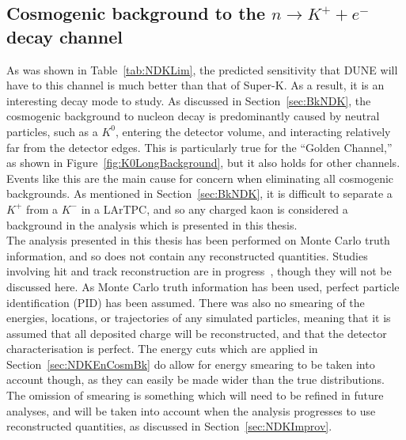 \subsection{Cosmogenic background to the $n \rightarrow K^{+} + e^{-}$ decay channel} \label{sec:NDKCosmBk}
As was shown in Table~\ref{tab:NDKLim}, the predicted sensitivity that DUNE will have to this channel is much better than that of Super-K. As a result, it is an interesting decay mode to study. As discussed in Section~\ref{sec:BkNDK}, the cosmogenic background to nucleon decay is predominantly caused by neutral particles, such as a $K^0$, entering the detector volume, and interacting relatively far from the detector edges. This is particularly true for the ``Golden Channel,'' as shown in Figure~\ref{fig:K0LongBackground}, but it also holds for other channels. Events like this are the main cause for concern when eliminating all cosmogenic backgrounds. As mentioned in Section~\ref{sec:BkNDK}, it is difficult to separate a $K^+$ from a $K^-$ in a LArTPC, and so any charged kaon is considered a background in the analysis which is presented in this thesis. \\

The analysis presented in this thesis has been performed on Monte Carlo truth information, and so does not contain any reconstructed quantities. Studies involving hit and track reconstruction are in progress~\citep{CosmoJanCollabMeeting}, though they will not be discussed here. As Monte Carlo truth information has been used, perfect particle identification (PID) has been assumed. There was also no smearing of the energies, locations, or trajectories of any simulated particles, meaning that it is assumed that all deposited charge will be reconstructed, and that the detector characterisation is perfect. The energy cuts which are applied in Section~\ref{sec:NDKEnCosmBk} do allow for energy smearing to be taken into account though, as they can easily be made wider than the true distributions. The omission of smearing is something which will need to be refined in future analyses, and will be taken into account when the analysis progresses to use reconstructed quantities, as discussed in Section~\ref{sec:NDKImprov}. \\ 


